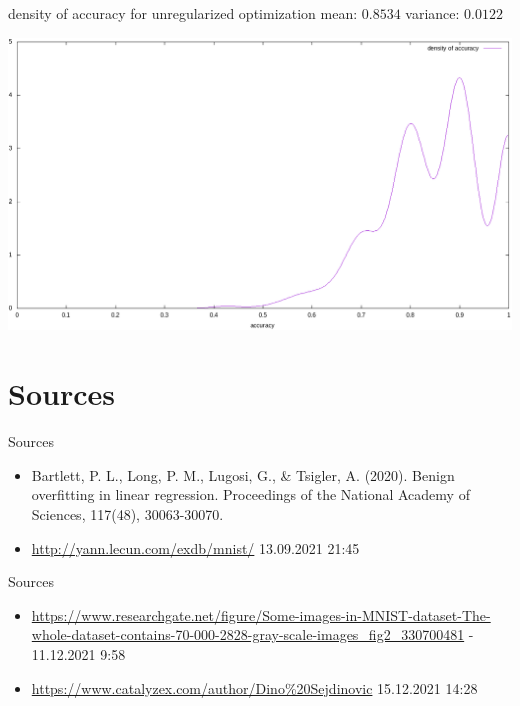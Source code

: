 \documentclass{beamer}
\begin{document}
\begin{frame}{density of accuracy for unregularized optimization}
mean: \(0.8534\) \hfill variance: \(0.0122\)
\begin{center}
	\includegraphics[width=\textwidth]{source/density_unregularized.png}
\end{center}
\end{frame}

\section{Sources}
\begin{frame}{Sources}
\tiny
\begin{itemize}
	\item Bartlett, P. L., Long, P. M., Lugosi, G., \& Tsigler, A. (2020). Benign overfitting in linear regression. Proceedings of the National Academy of Sciences, 117(48), 30063-30070.
	\item \url{http://yann.lecun.com/exdb/mnist/} 13.09.2021 21:45
\end{itemize}
\end{frame}

\begin{frame}{Sources}
\tiny
\begin{itemize}
	\item \url{https://www.researchgate.net/figure/Some-images-in-MNIST-dataset-The-whole-dataset-contains-70-000-2828-gray-scale-images_fig2_330700481} - 11.12.2021 9:58
	\item \url{https://www.catalyzex.com/author/Dino\%20Sejdinovic} 15.12.2021 14:28
\end{itemize}
\end{frame}
\end{document}
